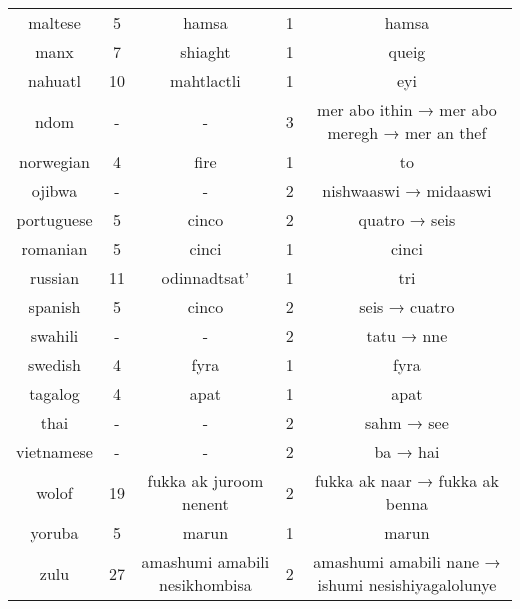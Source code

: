 \begin{landscape}
\begin{longtable}{|c|c|c|c|c|}
      maltese &   5 &                            hamsa &   1 &                                             hamsa \\
         manx &   7 &                          shiaght &   1 &                                             queig \\
      nahuatl &  10 &                       mahtlactli &   1 &                                               eyi \\
         ndom &   - &                                - &   3 &      mer abo ithin → mer abo meregh → mer an thef \\
    norwegian &   4 &                             fire &   1 &                                                to \\
       ojibwa &   - &                                - &   2 &                             nishwaaswi → midaaswi \\
   portuguese &   5 &                            cinco &   2 &                                     quatro → seis \\
     romanian &   5 &                            cinci &   1 &                                             cinci \\
      russian &  11 &                     odinnadtsat' &   1 &                                               tri \\
      spanish &   5 &                            cinco &   2 &                                     seis → cuatro \\
      swahili &   - &                                - &   2 &                                        tatu → nne \\
      swedish &   4 &                             fyra &   1 &                                              fyra \\
      tagalog &   4 &                             apat &   1 &                                              apat \\
         thai &   - &                                - &   2 &                                        sahm → see \\
   vietnamese &   - &                                - &   2 &                                          ba → hai \\
        wolof &  19 &           fukka ak juroom nenent &   2 &                    fukka ak naar → fukka ak benna \\
       yoruba &   5 &                            marun &   1 &                                             marun \\
         zulu &  27 &    amashumi amabili nesikhombisa &   2 & amashumi amabili nane → ishumi nesishiyagalolunye \\
\end{longtable}
\end{landscape}
